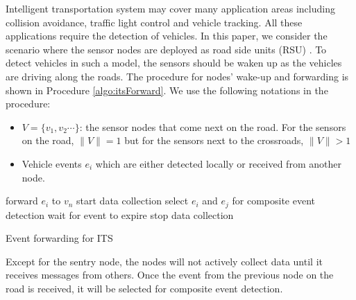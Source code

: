 Intelligent transportation system may cover many application areas including collision avoidance, traffic light control and vehicle tracking. All these applications require the detection of vehicles. In this paper, we consider the scenario where the sensor nodes are deployed as road side units (RSU) \cite{klein:its}. To detect vehicles in such a model, the sensors should be waken up as the vehicles are driving along the roads. The procedure for nodes' wake-up and forwarding is shown in Procedure \ref{algo:itsForward}. We use the following notations in the procedure:
\begin{itemize}
\item \(V=\{v_1, v_2 \cdots \}\): the sensor nodes that come next on the road. For the sensors on the road, \(\|V\|=1\) but for the sensors next to the crossroads, \(\|V\|>1\)
\item Vehicle events \(e_i\) which are either detected locally or received from another node.
\end{itemize}

\begin{algorithm}
\begin{algorithmic}
			\STATE forward \(e_i\) to \(v_n\)
		\ENDFOR
	\ENDIF
		\STATE start data collection
			\STATE select \(e_i\) and \(e_j\) for composite event detection
		\ELSE
			\STATE wait for event to expire
		\ENDIF
		\STATE stop data collection
	\ENDIF
\end{algorithmic}
\caption{Event forwarding for ITS}
\label{algo:itsForward}
\end{algorithm}

Except for the sentry node, the nodes will not actively collect data until it receives messages from others. Once the event from the previous node on the road is received, it will be selected for composite event detection. 